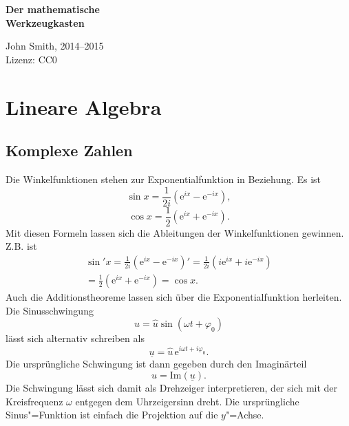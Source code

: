 \documentclass[a4paper,10pt,fleqn,twocolumn,twoside]{article}
\begin{document}

\begin{huge}
\noindent
\textbf{Der mathematische\\
Werkzeugkasten}
\par
\end{huge}
\vspace{1em}
\noindent
John Smith, 2014--2015\\
Lizenz: CC0

\tableofcontents



\newpage
\section{Lineare Algebra}
\subsection{Komplexe Zahlen}

Die Winkelfunktionen stehen zur Exponentialfunktion
in Beziehung. Es ist
\[\sin x = \frac{1}{2i}(\mathrm{e}^{ix}-\mathrm{e}^{-ix}),\]
\[\cos x = \frac{1}{2}(\mathrm{e}^{ix}+\mathrm{e}^{-ix}).\]
%
Mit diesen Formeln lassen sich die Ableitungen der Winkelfunktionen
gewinnen. Z.B. ist
\begin{gather*}
\sin' x = \frac{1}{2i}(\mathrm{e}^{ix}-\mathrm{e}^{-ix})'
= \frac{1}{2i}(i\mathrm{e}^{ix}+i\mathrm{e}^{-ix})\\
= \frac{1}{2}(\mathrm{e}^{ix}+\mathrm{e}^{-ix})
= \cos x.
\end{gather*}
Auch die Additionstheoreme lassen sich über die Exponentialfunktion
herleiten. Die Sinusschwingung
\[u = \hat u\sin(\omega t+\varphi_0)\]
%
lässt sich alternativ schreiben als
\[\underline u = \hat u\,\mathrm{e}^{i\omega t+i\varphi_0}.\]
%
Die ursprüngliche Schwingung ist dann gegeben durch den Imaginärteil
\[u = \mathrm{Im}(\underline u).\]
%
Die Schwingung lässt sich damit als Drehzeiger interpretieren, der
sich mit der Kreisfrequenz \(\omega\) entgegen dem Uhrzeigersinn
dreht. Die ursprüngliche Sinus"=Funktion ist einfach die Projektion
auf die \(y\)"=Achse.
\end{document}
